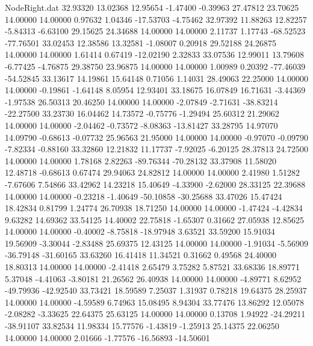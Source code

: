 \begin{filecontents}{NodeRight.dat}
  32.93320   13.02368   12.95654    -1.47400   -0.39963   27.47812   23.70625   14.00000   14.00000    0.97632    1.04346  -17.53703   -4.75462
  32.97392   11.88263   12.82257    -5.84313   -6.63100   29.15625   24.34688   14.00000   14.00000    2.11737    1.17743  -68.52523  -77.76501
  33.02453   12.38586   13.32581    -1.08007    0.20918   29.52188   24.26875   14.00000   14.00000    1.61414    0.67419  -12.02190    2.32833
  33.07536   12.99011   13.79608    -6.77425   -4.76875   29.38750   23.96875   14.00000   14.00000    1.00989    0.20392  -77.46039  -54.52845
  33.13617   14.19861   15.64148     0.71056    1.14031   28.49063   22.25000   14.00000   14.00000   -0.19861   -1.64148    8.05954   12.93401
  33.18675   16.07849   16.71631    -3.44369   -1.97538   26.50313   20.46250   14.00000   14.00000   -2.07849   -2.71631  -38.83214  -22.27500
  33.23730   16.04462   14.73572    -0.75776   -1.29494   25.60312   21.29062   14.00000   14.00000   -2.04462   -0.73572   -8.08363  -13.81427
  33.28795   14.97070   14.09790    -0.68613   -0.07732   25.96563   21.95000   14.00000   14.00000   -0.97070   -0.09790   -7.82334   -0.88160
  33.32860   12.21832   11.17737    -7.92025   -6.20125   28.37813   24.72500   14.00000   14.00000    1.78168    2.82263  -89.76344  -70.28132
  33.37908   11.58020   12.48718    -0.68613    0.67474   29.94063   24.82812   14.00000   14.00000    2.41980    1.51282   -7.67606    7.54866
  33.42962   14.23218   15.40649    -4.33900   -2.62000   28.33125   22.39688   14.00000   14.00000   -0.23218   -1.40649  -50.10858  -30.25688
  33.47026   15.47424   18.42834     0.81799    1.24774   26.70938   18.71250   14.00000   14.00000   -1.47424   -4.42834    9.63282   14.69362
  33.54125   14.40002   22.75818    -1.65307    0.31662   27.05938   12.85625   14.00000   14.00000   -0.40002   -8.75818  -18.97948    3.63521
  33.59200   15.91034   19.56909    -3.30044   -2.83488   25.69375   12.43125   14.00000   14.00000   -1.91034   -5.56909  -36.79148  -31.60165
  33.63260   16.41418   11.34521     0.31662    0.49568   24.40000   18.80313   14.00000   14.00000   -2.41418    2.65479    3.75282    5.87521
  33.68336   18.89771    5.37048    -4.41063   -3.80181   21.26562   26.40938   14.00000   14.00000   -4.89771    8.62952  -49.79936  -42.92540
  33.73421   18.59589    7.25037     1.31937    0.78218   19.64375   28.25937   14.00000   14.00000   -4.59589    6.74963   15.08495    8.94304
  33.77476   13.86292   12.05078    -2.08282   -3.33625   22.64375   25.63125   14.00000   14.00000    0.13708    1.94922  -24.29211  -38.91107
  33.82534   11.98334   15.77576    -1.43819   -1.25913   25.14375   22.06250   14.00000   14.00000    2.01666   -1.77576  -16.56893  -14.50601

\end{filecontents}
